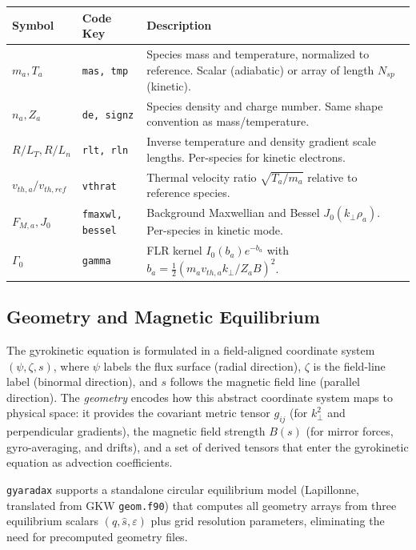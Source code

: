 \documentclass{article}
\theoremstyle{plain}
\theoremstyle{definition}
\theoremstyle{remark}
\begin{document}
\begin{longtable}{p{} p{} p{}}
\toprule
\textbf{Symbol} & \textbf{Code Key} & \textbf{Description} \\
\midrule
\endfirsthead
\midrule
\endhead
\bottomrule
\endfoot
$m_a, T_a$ & \texttt{mas, tmp} & Species mass and temperature, normalized to reference. Scalar (adiabatic) or array of length $N_{sp}$ (kinetic). \\
$n_a, Z_a$ & \texttt{de, signz} & Species density and charge number. Same shape convention as mass/temperature. \\
$R/L_T, R/L_n$ & \texttt{rlt, rln} & Inverse temperature and density gradient scale lengths. Per-species for kinetic electrons. \\
$v_{th,a}/v_{th,ref}$ & \texttt{vthrat} & Thermal velocity ratio $\sqrt{T_a/m_a}$ relative to reference species. \\
$F_{M,a}, J_0$ & \texttt{fmaxwl, bessel} & Background Maxwellian and Bessel $J_0(k_\perp \rho_a)$. Per-species in kinetic mode. \\
$\Gamma_0$ & \texttt{gamma} & FLR kernel $I_0(b_a) e^{-b_a}$ with $b_a = \tfrac{1}{2}(m_a v_{th,a} k_\perp / Z_a B)^2$. \\
\bottomrule
\end{longtable}

\subsection{Geometry and Magnetic Equilibrium}
\label{app:geometry}

The gyrokinetic equation is formulated in a field-aligned coordinate system $(\psi, \zeta, s)$, where $\psi$ labels the flux surface (radial direction), $\zeta$ is the field-line label (binormal direction), and $s$ follows the magnetic field line (parallel direction). The \textit{geometry} encodes how this abstract coordinate system maps to physical space: it provides the covariant metric tensor $g_{ij}$ (for $k_\perp^2$ and perpendicular gradients), the magnetic field strength $B(s)$ (for mirror forces, gyro-averaging, and drifts), and a set of derived tensors that enter the gyrokinetic equation as advection coefficients.

\texttt{gyaradax} supports a standalone circular equilibrium model (Lapillonne, translated from GKW \texttt{geom.f90}) that computes all geometry arrays from three equilibrium scalars $(q, \hat{s}, \varepsilon)$ plus grid resolution parameters, eliminating the need for precomputed geometry files.
\end{document}
